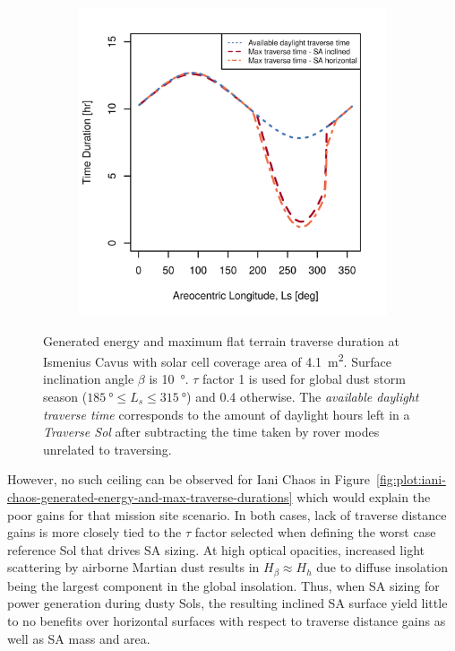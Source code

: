 \documentclass[twocolumn,letterpaper]{IEEEAerospaceCLS}  %
\newcommand{\refFig}[1]{{Figure}~\ref{#1}} %
\newlength{\subfigureWidth}
\newlength{\graphicsHeight}
\begin{document}
\begin{figure}[h]
\begin{subfigure}[t]{\subfigureWidth}
    \centering
    \includegraphics[height=\graphicsHeight]{figures/plots/ismeniuscavus-75w-max-traverse-durations-for-solar-cell-coverage-area-41m2.png}
    \label{fig:plot:sub:ismenius-cavus-max-traverse-durations}
  \end{subfigure}
  \caption{Generated energy and maximum flat terrain traverse duration at Ismenius Cavus with solar cell coverage area of \SI{4.1}{m^{2}}. Surface inclination angle $\beta$ is \SI{10}{\degree}. $\tau$ factor 1 is used for global dust storm season ($\SI{185}{\degree} \leq L_{s} \leq \SI{315}{\degree}$) and 0.4 otherwise. The \textit{available daylight traverse time} corresponds to the amount of daylight hours left in a \textit{Traverse Sol} after subtracting the time taken by rover modes unrelated to traversing.}
  \label{fig:plot:ismenius-cavus-generated-energy-and-max-traverse-durations}
\end{figure}

However, no such ceiling can be observed for Iani Chaos in \refFig{fig:plot:iani-chaos-generated-energy-and-max-traverse-durations} which would explain the poor gains for that mission site scenario. In both cases, lack of traverse distance gains is more closely tied to the $\tau$ factor selected when defining the worst case reference Sol that drives \ac{SA} sizing. At high optical opacities, increased light scattering by airborne Martian dust results in $H_{\beta} \approx H_{h}$ due to diffuse insolation being the largest component in the global insolation. Thus, when \ac{SA} sizing for power generation during dusty Sols, the resulting inclined \ac{SA} surface yield little to no benefits over horizontal surfaces with respect to traverse distance gains as well as \ac{SA} mass and area.
\end{document}
